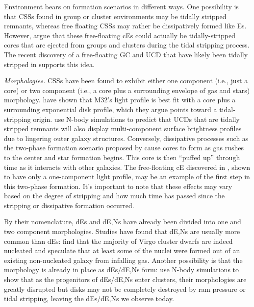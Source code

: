 \documentclass[iop,apj]{emulateapj}
\begin{document}
Environment bears on formation scenarios in different ways. One possibility is that CSSs found in group or cluster environments may be tidally stripped remnants, whereas free floating CSSs may rather be dissipatively formed like Es. However, \citet{Chilingarian2015} argue that these free-floating cEs could actually be tidally-stripped cores that are ejected from groups and clusters during the tidal stripping process. The recent discovery of a free-floating GC and UCD that have likely been tidally stripped in \citet{Sandoval2015} supports this idea.

\textit{Morphologies.} CSSs have been found to exhibit either one component (i.e., just a core) or two component (i.e., a core plus a surrounding envelope of gas and stars) morphology. \citet{Graham2002} have shown that M32's light profile is best fit with a core plus a surrounding exponential disk profile, which they argue points toward a tidal-stripping origin. \citet{Pfeffer2013} use N-body simulations to predict that UCDs that are tidally stripped remnants will also display multi-component surface brightness profiles due to lingering outer galaxy structures. Conversely, dissipative processes such as the two-phase formation scenario proposed by \citet{Oser2010} cause cores to form as gas rushes to the center and star formation begins. This core is then ``puffed up'' through time as it interacts with other galaxies. The free-floating cE discovered in \citet{Huxor2013}, shown to have only a one-component light profile, may be an example of the first step in this two-phase formation. It's important to note that these effects may vary based on the degree of stripping and how much time has passed since the stripping or dissipative formation occurred.

By their nomenclature, dEs and dE,Ns have already been divided into one and two component morphologies. Studies have found that dE,Ns are usually more common than dEs: \citet{Grant2005} find that the majority of Virgo cluster dwarfs are indeed nucleated and speculate that at least some of the nuclei were formed out of an existing non-nucleated galaxy from infalling gas. Another possibility is that the morphology is already in place as dEs/dE,Ns form: \citet{Mastropietro2005a} use N-body simulations to show that as the progenitors of dEs/dE,Ns enter clusters, their morphologies are greatly disrupted but disks may not be completely destroyed by ram pressure or tidal stripping, leaving the dEs/dE,Ns we observe today.
\end{document}
